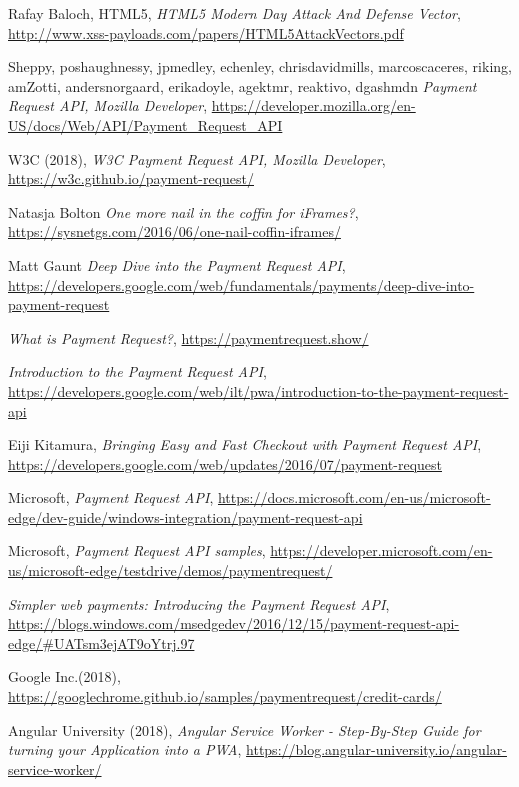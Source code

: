 \documentclass[11pt ,a4paper , twoside , openright ]{article}
\begin{document}
\begin{thebibliography}{99}
	\bibitem{}
	Rafay Baloch, HTML5,
	\emph{HTML5 Modern Day Attack And Defense Vector},
	\url{http://www.xss-payloads.com/papers/HTML5AttackVectors.pdf}
	
	
	\bibitem{}
	Sheppy, poshaughnessy, jpmedley, echenley, chrisdavidmills, marcoscaceres, riking, amZotti, andersnorgaard, erikadoyle, agektmr, reaktivo, dgashmdn
	\emph{Payment Request API, Mozilla Developer},
	\url{https://developer.mozilla.org/en-US/docs/Web/API/Payment_Request_API}
	
	\bibitem{}
	W3C (2018),
	\emph{W3C Payment Request API, Mozilla Developer},
	\url{https://w3c.github.io/payment-request/}
	
	\bibitem{}
	Natasja Bolton
	\emph{One more nail in the coffin for iFrames?}, 
	\url{https://sysnetgs.com/2016/06/one-nail-coffin-iframes/}
	
	\bibitem{}
	Matt Gaunt
	\emph{Deep Dive into the Payment Request API}, 
	\url{https://developers.google.com/web/fundamentals/payments/deep-dive-into-payment-request}
	
	\bibitem{}
	\emph{What is Payment Request?},
	\url{https://paymentrequest.show/}
	
	\bibitem{}
	\emph{Introduction to the Payment Request API},
	\url{https://developers.google.com/web/ilt/pwa/introduction-to-the-payment-request-api}
	
	\bibitem{}
	Eiji Kitamura,
	\emph{Bringing Easy and Fast Checkout with Payment Request API},
	\url{https://developers.google.com/web/updates/2016/07/payment-request}
	
	\bibitem{}
	Microsoft,
	\emph{Payment Request API},
	\url{https://docs.microsoft.com/en-us/microsoft-edge/dev-guide/windows-integration/payment-request-api}
	
	\bibitem{}
	Microsoft,
	\emph{Payment Request API samples},
	\url{https://developer.microsoft.com/en-us/microsoft-edge/testdrive/demos/paymentrequest/}
	
	\bibitem{}
	\emph{Simpler web payments: Introducing the Payment Request API},
	\url{https://blogs.windows.com/msedgedev/2016/12/15/payment-request-api-edge/#UATsm3ejAT9oYtrj.97}
	
	\bibitem{}
	Google Inc.(2018),
	\url{https://googlechrome.github.io/samples/paymentrequest/credit-cards/}
	
	\bibitem{}
	Angular University (2018),
	\emph{Angular Service Worker - Step-By-Step Guide for turning your Application into a PWA},
	\url{https://blog.angular-university.io/angular-service-worker/}
	

\end{thebibliography}
\end{document}
